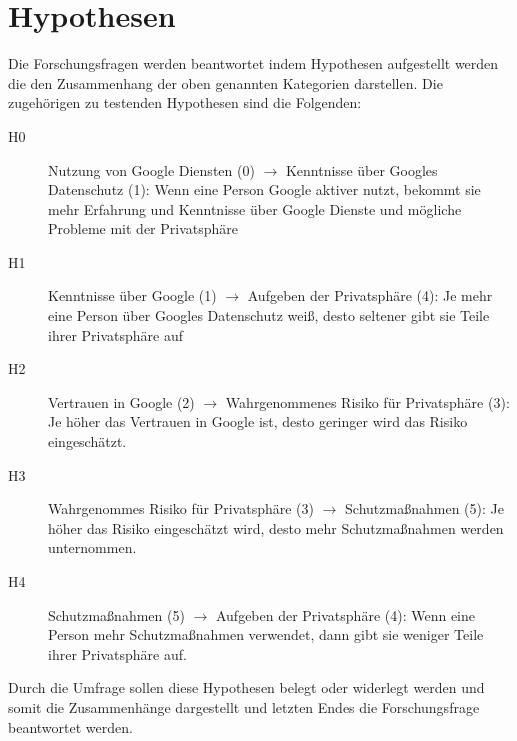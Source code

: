 \section{Hypothesen}
Die Forschungsfragen werden beantwortet indem Hypothesen aufgestellt werden die den Zusammenhang der oben genannten Kategorien darstellen.
Die zugehörigen zu testenden Hypothesen sind die Folgenden:
\begin{description}
\item[H0] Nutzung von Google Diensten (0) $\rightarrow$ Kenntnisse über Googles Datenschutz (1): Wenn eine Person Google aktiver nutzt, bekommt sie mehr Erfahrung und Kenntnisse über Google Dienste und mögliche Probleme mit der Privatsphäre
\item[H1] Kenntnisse über Google (1) $\rightarrow$ Aufgeben der Privatsphäre (4): Je mehr eine Person über Googles Datenschutz weiß, desto seltener gibt sie Teile ihrer Privatsphäre auf
\item[H2] Vertrauen in Google (2) $\rightarrow$ Wahrgenommenes Risiko für Privatsphäre (3): Je höher das Vertrauen in Google ist, desto geringer wird das Risiko eingeschätzt.
\item[H3] Wahrgenommes Risiko für Privatsphäre (3) $\rightarrow$ Schutzmaßnahmen (5): Je höher das Risiko eingeschätzt wird, desto mehr Schutzmaßnahmen werden unternommen.
\item[H4] Schutzmaßnahmen (5) $\rightarrow$ Aufgeben der Privatsphäre (4): Wenn eine Person mehr Schutzmaßnahmen verwendet, dann gibt sie weniger Teile ihrer Privatsphäre auf.
\end{description}
Durch die Umfrage sollen diese Hypothesen belegt oder widerlegt werden und somit die Zusammenhänge dargestellt und letzten Endes die Forschungsfrage beantwortet werden.